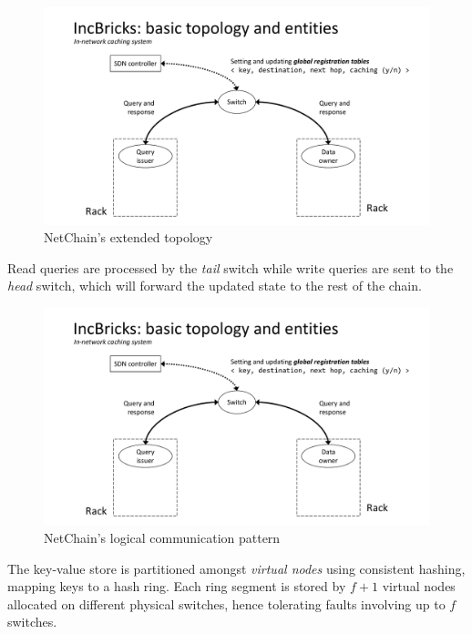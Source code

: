 \begin{figure}[!htb]
    \centering
        \includegraphics[page=6, clip, trim=3.6cm 0.7cm 3.2cm 4.15cm, width=1.00\textwidth]{figures/analysis/inp/presentation.pdf}
    \caption{NetChain's \texorpdfstring{\cite{netchain}}{} extended topology}
\end{figure}

Read queries are processed by the \textit{tail} switch while write queries are sent to the \textit{head} switch, which will forward the updated state to the rest of the chain.

\begin{figure}[!htb]
    \centering
        \includegraphics[page=7, clip, trim=3.6cm 0.7cm 3.6cm 4.15cm, width=1.00\textwidth]{figures/analysis/inp/presentation.pdf}
    \caption{NetChain's \texorpdfstring{\cite{netchain}}{} logical communication pattern}
\end{figure}

The key-value store is partitioned amongst \textit{virtual nodes} using consistent hashing, mapping keys to a hash ring.
Each ring segment is stored by $f + 1$ virtual nodes allocated on different physical switches, hence tolerating faults involving up to $f$ switches.

